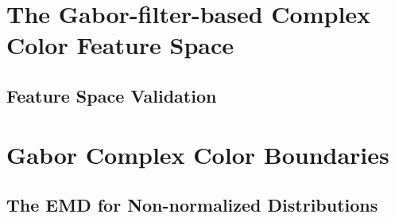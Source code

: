 \documentclass[journal]{IEEEtran}
\begin{document}
%        


\section{The Gabor-filter-based Complex Color Feature Space}
\subsection{Feature Space Validation}

\section{Gabor Complex Color Boundaries}
\subsection{The EMD for Non-normalized Distributions}
\end{document}
